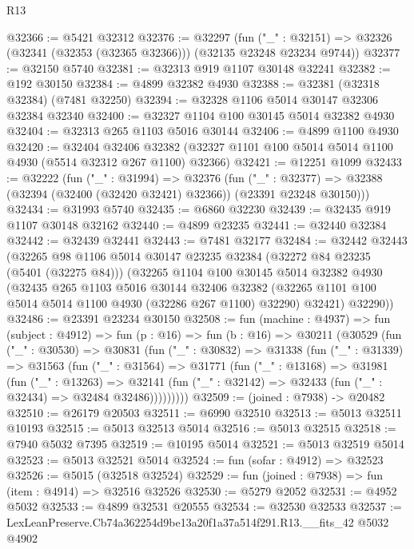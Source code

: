 \begin{lexlean}{R13}
\begin{coremodule}
@32366 := @5421 @32312
@32376 := @32297
    (fun ("_" : @32151) => @32326 (@32341 (@32353 (@32365 @32366))) (@32135 @23248 @23234 @9744))
@32377 := @32150 @5740
@32381 := @32313 @919 @1107 @30148 @32241
@32382 := @192 @30150
@32384 := @4899 @32382 @4930
@32388 := @32381 (@32318 @32384) (@7481 @32250)
@32394 := @32328 @1106 @5014 @30147 @32306 @32384 @32340
@32400 := @32327 @1104 @100 @30145 @5014 @32382 @4930
@32404 := @32313 @265 @1103 @5016 @30144
@32406 := @4899 @1100 @4930
@32420 := @32404
    @32406
    @32382
    (@32327 @1101 @100 @5014 @5014 @1100 @4930 (@5514 @32312 @267 @1100) @32366)
@32421 := @12251 @1099
@32433 := @32222
    (fun ("_" : @31994) =>
    @32376
      (fun ("_" : @32377) =>
      @32388 (@32394 (@32400 (@32420 @32421) @32366)) (@23391 @23248 @30150)))
@32434 := @31993 @5740
@32435 := @6860 @32230
@32439 := @32435 @919 @1107 @30148 @32162
@32440 := @4899 @23235
@32441 := @32440 @32384
@32442 := @32439 @32441
@32443 := @7481 @32177
@32484 := @32442
    @32443
    (@32265
      @98
      @1106
      @5014
      @30147
      @23235
      @32384
      (@32272 @84 @23235 (@5401 (@32275 @84)))
      (@32265
        @1104
        @100
        @30145
        @5014
        @32382
        @4930
        (@32435
          @265
          @1103
          @5016
          @30144
          @32406
          @32382
          (@32265 @1101 @100 @5014 @5014 @1100 @4930 (@32286 @267 @1100) @32290)
          @32421)
        @32290))
@32486 := @23391 @23234 @30150
@32508 := fun (machine : @4937) =>
  fun (subject : @4912) =>
  fun (p : @16) =>
  fun (b : @16) =>
  @30211
    (@30529
      (fun ("_" : @30530) =>
      @30831
        (fun ("_" : @30832) =>
        @31338
          (fun ("_" : @31339) =>
          @31563
            (fun ("_" : @31564) =>
            @31771
              (fun ("_" : @13168) =>
              @31981
                (fun ("_" : @13263) =>
                @32141 (fun ("_" : @32142) => @32433 (fun ("_" : @32434) => @32484 @32486)))))))))
@32509 := (joined : @7938) -> @20482
@32510 := @26179 @20503
@32511 := @6990 @32510
@32513 := @5013 @32511 @10193
@32515 := @5013 @32513 @5014
@32516 := @5013 @32515
@32518 := @7940 @5032 @7395
@32519 := @10195 @5014
@32521 := @5013 @32519 @5014
@32523 := @5013 @32521 @5014
@32524 := fun (sofar : @4912) => @32523
@32526 := @5015 (@32518 @32524)
@32529 := fun (joined : @7938) => fun (item : @4914) => @32516 @32526
@32530 := @5279 @2052
@32531 := @4952 @5032
@32533 := @4899 @32531 @20555
@32534 := @32530 @32533
@32537 := LexLeanPreserve.Cb74a362254d9be13a20f1a37a514f291.R13.__fits_42 @5032 @4902

\end{coremodule}
\end{lexlean}
